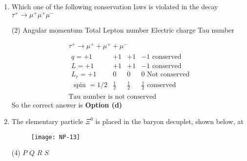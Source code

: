\begin{enumerate}
\begin{tasks}
		\task[\textbf{b.}] Isospin $=1$, Strangeness $=0$
		\task[\textbf{c.}]Isospin $=\frac{1}{2}$, Strangeness $=+1$
		\task[\textbf{d.}]  Isospin $=\frac{1}{2}$, Strangeness $=-1$
	\end{tasks}
	\begin{answer}
		\begin{align*}
		&\text{$\pi^{+}, \pi^0, \pi^{-}$are not strange particle thus strangness $=0$} \\
		&\text{Since meson group contain 3 particles, thus $I=1$}
		\end{align*}
		So the correct answer is \textbf{Option (b)}
	\end{answer}
	\item  Which one of the following conservation laws is violated in the decay $\tau^{+} \rightarrow \mu^{+} \mu^{+} \mu^{-}$
	{}
	\begin{tasks}(2)
		\task[\textbf{a.}]Angular momentum
		\task[\textbf{b.}]Total Lepton number
		\task[\textbf{c.}]Electric charge
		\task[\textbf{d.}]Tau number 
	\end{tasks}
	\begin{answer}
		\begin{align*}
		&\tau^{+} \rightarrow \mu^{+}+\mu^{+}+\mu^{-}\\
		&\begin{array}{lccc}
		q=+1 & +1 & +1 & -1 \text { conserved } \\
		L=+1 & +1 & +1 & -1 \text { conserved } \\
		L_r=+1 & 0 & 0 & 0 \text { Not conserved } \\
		\text { spin }=1 / 2 & \frac{1}{2} & \frac{1}{2} & \frac{1}{2} \text { conserved }
		\end{array}\\
		&\text{Tau number is not conserved}
		\end{align*}
		So the correct answer is \textbf{Option (d)}
	\end{answer}
	\item  The elementary particle $\Xi^0$ is placed in the baryon decuplet, shown below, at
	{}
	\begin{figure}[H]
		\centering
		\texttt{[image: NP-13]}
	\end{figure}
	\begin{tasks}(4)
		\task[\textbf{a.}]$P$
		\task[\textbf{b.}]$Q$
		\task[\textbf{c.}]$R$
		\task[\textbf{d.}] $S$ 
	\end{tasks}
	\begin{answer}$\left. \right. $

\end{answer}
\end{enumerate}
